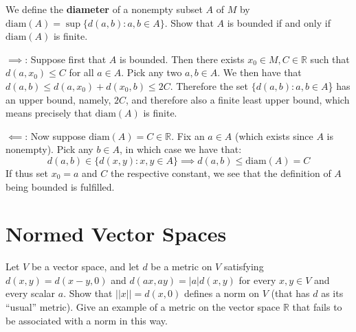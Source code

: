 \begin{exercise}{15}
    We define the \textbf{diameter} of a nonempty subset $A$ of $M$ by $\text{diam}(A) = \sup\{d(a, b) : a, b \in A\}$.
    Show that $A$ is bounded if and only if $\text{diam}(A)$ is finite.
\end{exercise}

\begin{solution}
    
    $\implies$: Suppose first that $A$ is bounded.
    Then there exists $x_0 \in M, C \in \mathbb{R}$ such that $d(a, x_0) \leq C$ for all $a \in A$.
    Pick any two $a, b \in A$.
    We then have that $d(a, b) \leq d(a, x_0) + d(x_0, b) \leq 2C$.
    Therefore the set $\{d(a, b): a, b \in A$\} has an upper bound, namely, $2C$, and therefore also a finite least upper bound, which means precisely that $\text{diam}(A)$ is finite.

    $\impliedby$: Now suppose $\text{diam}(A) = C \in \mathbb{R}$.
    Fix an $a \in A$ (which exists since $A$ is nonempty).
    Pick any $b \in A$, in which case we have that:
    $$d(a, b) \in \{d(x, y): x, y \in A\} \implies d(a, b) \leq \text{diam}(A) = C$$
    If thus set $x_0 = a$ and $C$ the respective constant, we see that the definition of $A$ being bounded is fulfilled.
\end{solution}

\section{Normed Vector Spaces}

\begin{exercise}{16}
    Let $V$ be a vector space, and let $d$ be a metric on $V$ satisfying $d(x, y) = d(x - y, 0)$ and $d(ax, ay) = \lvert a \rvert d(x, y)$ for every $x, y \in V$ and every scalar $a$.
    Show that $\lvert \lvert x \rvert \rvert = d(x, 0)$ defines a norm on $V$ (that has $d$ as its ``usual'' metric).
    Give an example of a metric on the vector space $\mathbb{R}$ that fails to be associated with a norm in this way.
\end{exercise}

